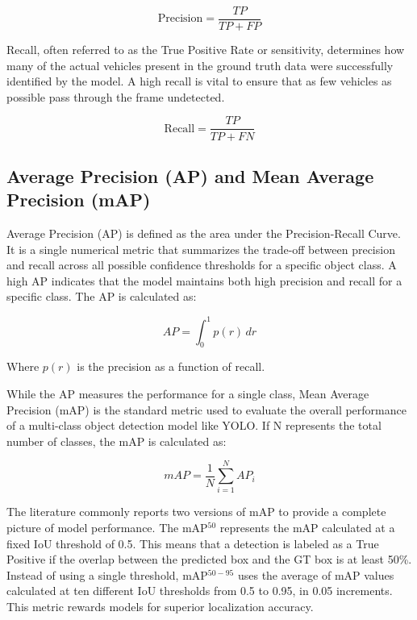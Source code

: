 \begin{equation}
\label{eq:precision}
\text{Precision} = \frac{TP}{TP + FP}
\end{equation}

Recall, often referred to as the True Positive Rate or sensitivity, determines how many of the actual vehicles present in the ground truth data were successfully identified by the model. A high recall is vital to ensure that as few vehicles as possible pass through the frame undetected.

\begin{equation}
\label{eq:recall}
\text{Recall} = \frac{TP}{TP + FN}
\end{equation}

\subsection*{Average Precision (AP) and Mean Average Precision (mAP)}
Average Precision (AP) is defined as the area under the Precision-Recall Curve. It is a single numerical metric that summarizes the trade-off between precision and recall across all possible confidence thresholds for a specific object class. A high AP indicates that the model maintains both high precision and recall for a specific class. The AP is calculated as:

\begin{equation}
AP = \int_{0}^{1} p(r) \, dr
\end{equation}

Where \(p(r)\) is the precision as a function of recall.

While the AP measures the performance for a single class, Mean Average Precision (mAP) is the standard metric used to evaluate the overall performance of a multi-class object detection model like YOLO. If N represents the total number of classes, the mAP is calculated as:

\begin{equation}
\label{eq:mAP_calc}
mAP = \frac{1}{N} \sum_{i=1}^{N} AP_i
\end{equation}

The literature commonly reports two versions of mAP to provide a complete picture of model performance. The mAP$^{50}$ represents the mAP calculated at a fixed IoU threshold of 0.5. This means that a detection is labeled as a True Positive if the overlap between the predicted box and the GT box is at least 50\%. Instead of using a single threshold, mAP$^{50-95}$ uses the average of mAP values calculated at ten different IoU thresholds from 0.5 to 0.95, in 0.05 increments. This metric rewards models for superior localization accuracy.

